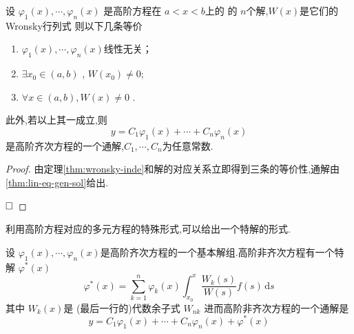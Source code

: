 \documentclass[lang=cn,12pt,color=green,fontset=none]{elegantbook}
\begin{document}
\begin{theorem}
    设 $ \varphi _{1}\left( x \right),\cdots ,\varphi _{n}\left( x \right)   $ 是高阶方程在 $ a<x<b $上的 的 $ n $个解,$ W\left( x \right)  $是它们的Wronsky行列式 则以下几条等价
    \begin{enumerate}
        \item  $ \varphi _{1}\left( x \right),\cdots ,\varphi _{n}\left( x \right)   $线性无关；
        \item  $ \exists x_0 \in \left( a,b \right)  $ , $ W\left( x_0 \right)  \neq  0  $;
        \item $ \forall x \in \left( a,b \right), W\left( x \right)\neq  0   $ . 
    \end{enumerate}
     此外,若以上其一成立,则 $$
     y=C_1\varphi _{1}\left( x \right)+ \cdots + C_{n}\varphi _{n}\left( x \right)  
     $$是高阶齐次方程的一个通解,$ C_1,\cdots ,C_{n} $为任意常数. 
\end{theorem}
\begin{proof}
    由定理\ref{thm:wronsky-inde}和解的对应关系立即得到三条的等价性,通解由\ref{thm:lin-eq-gen-sol}给出.
    
    $\hfill\square$
\end{proof}

利用高阶方程对应的多元方程的特殊形式,可以给出一个特解的形式.
\begin{theorem}\label{thm:high-eq-sol}
    设 $ \varphi _{1}\left( x \right),\cdots ,\varphi _{n}\left( x \right)   $是高阶齐次方程的一个基本解组.高阶非齐次方程有一个特解 $ \varphi ^{*}\left( x \right)  $ 
    \begin{equation}
        \varphi ^{*}\left( x \right) = \sum _{k=1}^{n}\varphi _{k}\left( x \right) \int_{x_0}^{x} \frac{W_{k}\left( s \right)  }{W\left( s \right)  }   f\left( s \right)\,\mathrm{d} s
    \end{equation}其中 $ W_{k}\left( x \right)  $是 (最后一行的)代数余子式 $ W_{nk} $ 进而高阶非齐次方程的一个通解是
    \begin{equation}
        y=C_1\varphi _{1}\left( x \right)+ \cdots + C_{n}\varphi _{n}\left( x \right)+  \varphi ^{*}\left( x \right)   
    \end{equation}
\end{theorem}
\end{document}
